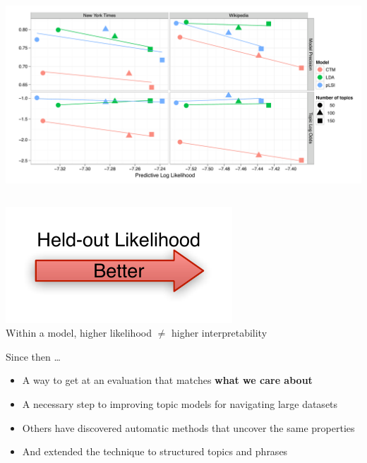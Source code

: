 \documentclass[compress]{beamer}
\begin{document}
{\begin{columns}
  \includegraphics[scale=\graphscale]{reading_tea_leaves/tasks/legend}
\end{columns}

\begin{center}
  \includegraphics[scale=\graphscale]{reading_tea_leaves/tasks/held-out} \\
Within a model, higher likelihood $\not =$ higher interpretability
\end{center}
}


\begin{frame}{Since then \dots}

  \begin{itemize}
    \item A way to get at an evaluation that matches {\bf what we care about}
    \item A necessary step to improving topic models for navigating large datasets~\cite{talley-11}
    \item Others have discovered automatic methods that uncover the same properties~\cite{newman-10,mimno-11}
    \item And extended the technique to structured topics and phrases~\cite{lindsey-12,weninger-12}
  \end{itemize}

\end{frame}
\end{document}
